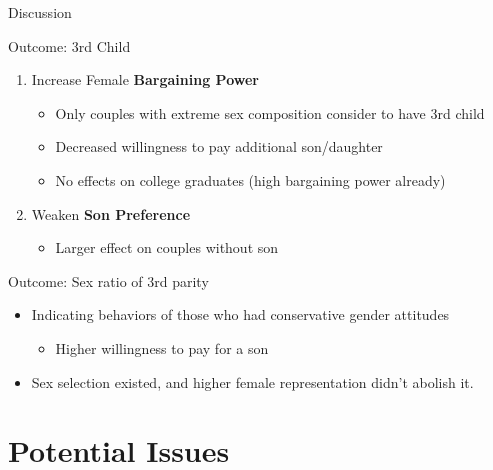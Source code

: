 \documentclass[
  9pt,
  ignorenonframetext,
  aspectratio=43,
]{beamer}
\providecommand{\tightlist}{%
  \setlength{\itemsep}{0pt}\setlength{\parskip}{0pt}}
\begin{document}
\begin{frame}{Discussion}
\protect\hypertarget{discussion}{}
\begin{block}{Outcome: 3rd Child}
\protect\hypertarget{outcome-3rd-child}{}
\begin{enumerate}
\tightlist
\item
  Increase Female \textbf{Bargaining Power}

  \begin{itemize}
  \tightlist
  \item
    Only couples with extreme sex composition consider to have 3rd child
  \item
    Decreased willingness to pay additional son/daughter
  \item
    No effects on college graduates (high bargaining power already)
  \end{itemize}
\item
  Weaken \textbf{Son Preference}

  \begin{itemize}
  \tightlist
  \item
    Larger effect on couples without son
  \end{itemize}
\end{enumerate}
\end{block}

\begin{block}{Outcome: Sex ratio of 3rd parity}
\protect\hypertarget{outcome-sex-ratio-of-3rd-parity}{}
\begin{itemize}
\tightlist
\item
  Indicating behaviors of those who had conservative gender attitudes

  \begin{itemize}
  \tightlist
  \item
    Higher willingness to pay for a son
  \end{itemize}
\item
  Sex selection existed, and higher female representation didn't abolish
  it.
\end{itemize}
\end{block}
\end{frame}

\hypertarget{potential-issues}{%
\section{Potential Issues}\label{potential-issues}}
\end{document}
